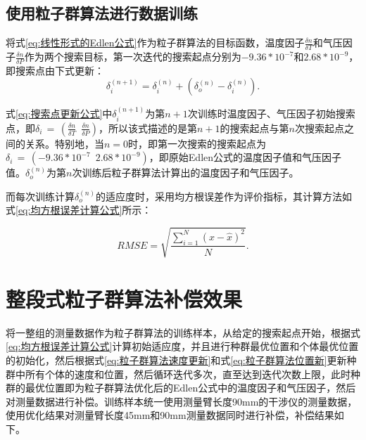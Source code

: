 \subsection{使用粒子群算法进行数据训练}
将式\eqref{eq:线性形式的Edlen公式}作为粒子群算法的目标函数，温度因子$\frac{\delta n}{\delta T}$和气压因子$\frac{\delta n}{\delta P}$作为两个搜索目标，第一次迭代的搜索起点分别为$-9.36*10^{-7}$和$2.68*10^{-9}$，即搜索点由下式更新：
\begin{equation}\label{eq:搜索点更新公式}
  \delta^{(n+1)}_i = \delta^{(n)}_i+(\delta^{(n)}_o-\delta^{(n)}_i).
  \end{equation}

式\eqref{eq:搜索点更新公式}中$\delta^{(n+1)}_i$为第$n+1$次训练时温度因子、气压因子初始搜索点，即$\delta_i\,=\,(\frac{\delta n}{\delta T}\,\,\,\frac{\delta n}{\delta P})$，所以该式描述的是第$n+1$的搜索起点与第$n$次搜索起点之间的关系。特别地，当$n=0$时，即第一次搜索的搜索起点为$\delta_i\,=\,(-9.36*10^{-7}\,\,\,2.68*10^{-9})$，即原始Edlen公式的温度因子值和气压因子值。$\delta_o^{(n)}$为第$n$次训练后粒子群算法计算出的温度因子和气压因子。

而每次训练计算$\delta_o^{(n)}$的适应度时，采用均方根误差作为评价指标，其计算方法如式\eqref{eq:均方根误差计算公式}所示：

\begin{equation}\label{eq:均方根误差计算公式}
  RMSE = \sqrt{\frac{\sum_{i=1}^{N}(x-\widehat x)^2}{N}}.
  \end{equation}


\section{整段式粒子群算法补偿效果}
将一整组的测量数据作为粒子群算法的训练样本，从给定的搜索起点开始，根据式\eqref{eq:均方根误差计算公式}计算初始适应度，并且进行种群最优位置和个体最优位置的初始化，然后根据式\eqref{eq:粒子群算法速度更新}和式\eqref{eq:粒子群算法位置新}更新种群中所有个体的速度和位置，然后循环迭代多次，直至达到迭代次数上限，此时种群的最优位置即为粒子群算法优化后的Edlen公式中的温度因子和气压因子，然后对测量数据进行补偿。训练样本统一使用测量臂长度90mm的干涉仪的测量数据，使用优化结果对测量臂长度45mm和90mm测量数据同时进行补偿，补偿结果如下。

